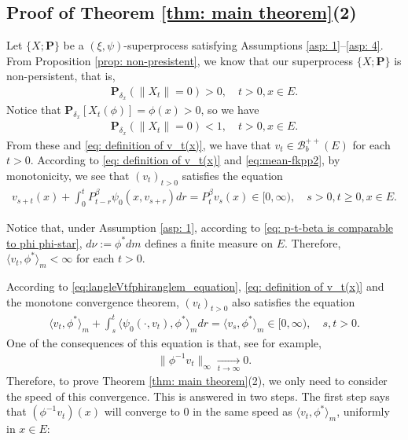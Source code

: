 \documentclass[UTF8]{pkuthss}
\theoremstyle{plain}
\theoremstyle{definition}
\numberwithin{equation}{section}
\begin{document}
\subsection{Proof of Theorem \ref{thm: main theorem}(2)}
\label{sec: proof of result 2}
	Let $\{X; \mathbf P\}$ be a $(\xi, \psi)$-superprocess satisfying
	Assumptions \ref{asp: 1}--\ref{asp: 4}.
	From Proposition \ref{prop: non-presistent}, we know that our superprocess $\{X;\mathbf P\}$ is non-persistent, that is,
\begin{align}
    \mathbf P_{\delta_x}(\|X_t\| = 0)
    > 0,
    \quad t>0, x \in E.
\end{align}
	Notice that $\mathbf P_{\delta_x}[X_t(\phi)] = \phi(x)>0$, so we have
\begin{align}
    \mathbf P_{\delta_x}(\|X_t\|= 0)<1,
    \quad t>0, x \in E.
\end{align}
	From these and \eqref{eq: definition of v_t(x)}, we have that $v_t \in \mathscr B^{++}_b(E)$ for each $t > 0$.
	According to \eqref{eq: definition of v_t(x)} and \eqref{eq:mean-fkpp2}, by monotonicity,
	we see that $(v_t)_{t > 0}$ satisfies the equation
\begin{align}
	v_{s+t}(x) + \int_0^t P^\beta_{t-r} \psi_0(x,v_{s+r}) dr
	= P^\beta_t v_s(x)
	\in [0,\infty),
	\quad s>0, t \geq 0,x \in E.
\end{align}

	Notice that, under Assumption \ref{asp: 1}, according to \eqref{eq: p-t-beta is comparable to phi phi-star}, $d\nu:= \phi^* dm$ defines a finite measure on $E$.
	Therefore, $\langle v_t, \phi^*\rangle_m < \infty$ for each $t>0$.

	According to \eqref{eq:langleVtfphiranglem_equation}, \eqref{eq: definition of v_t(x)} and the monotone convergence theorem,
	$(v_t)_{t> 0}$ also satisfies the equation
\begin{align} \label{eq: equation of <vt,phi>}
	\langle v_t,\phi^*\rangle_m + \int_s^t \langle \psi_0(\cdot ,v_t) , \phi^*\rangle_m dr
	= \langle v_s,\phi^*\rangle_m
	\in [0,\infty),
	\quad s, t > 0.
\end{align}
	One of the consequences of this equation is that, see \cite[Lemma 5.1]{RenSongSun2019Spine} for example,
\begin{align} \label{eq: uniform converges to 0}
    \|\phi^{-1}v_t\|_{\infty} \xrightarrow[t\to \infty]{} 0.
\end{align}
	Therefore, to prove Theorem \ref{thm: main theorem}(2), we only need to consider the speed of this convergence.
	This is answered in two steps.
	The first step says that $(\phi^{-1}v_t)(x)$ will converge to $0$ in the same speed as $\langle v_t,\phi^*\rangle_m $, uniformly in $x\in E$:
\end{document}

